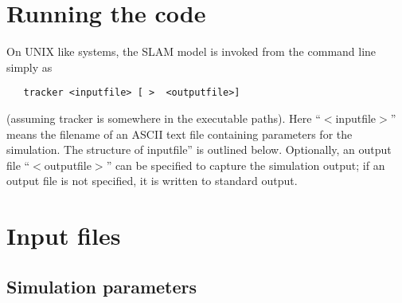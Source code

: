 \section{Running the code}

On UNIX like systems, the SLAM model is invoked from the command line simply as 
\begin{verbatim}
   tracker <inputfile> [ >  <outputfile>]
\end{verbatim}
(assuming tracker is somewhere in the executable paths). Here ``$<$inputfile$>$''
means the filename of an ASCII text file containing parameters for the simulation. The
structure of inputfile'' is outlined below. Optionally, an output file ``$<$outputfile$>$''
can be specified to capture the simulation output; if an output file is not specified, it is
written to standard output.

\section{Input files}
 
\subsection{Simulation parameters}
 
